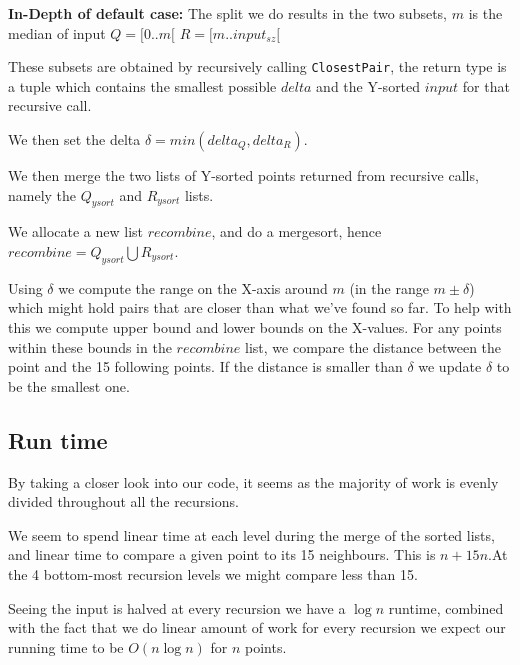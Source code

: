 \documentclass{tufte-handout}
\begin{document}
\bigskip
\textbf{In-Depth of default case:}\newline
The split we do results in the two subsets, $m$ is the median of input\newline
  $Q = \lbrack 0 .. m \lbrack $\newline
  $R = \lbrack m .. input_{sz} \lbrack$ \newline 

These subsets are obtained by recursively calling \verb+ClosestPair+, the return type 
is a tuple which contains the smallest possible $delta$ and the Y-sorted $input$ for that recursive call.

We then set the delta $\delta = min(delta_{Q}, delta_{R})$.\newline

We then merge the two lists of Y-sorted points returned from recursive calls, namely the $Q_{ysort}$ and $R_{ysort}$ lists.

We allocate a new list $recombine$, and do a mergesort, hence\newline $recombine = Q_{y sort} \bigcup R_{y sort}$.
\newline

Using $\delta$ we compute the range on the X-axis around $m$ (in the range $m \pm \delta$) which 
might hold pairs that are closer than what we've found so far.
To help with this we compute upper bound and lower bounds on the X-values.\newline
For any points within these bounds in the $recombine$ list, we compare the distance between the point
 and the 15 following points.
If the distance is smaller than $\delta$ we update $\delta$ to be the smallest one.

\subsection{Run time}
By taking a closer look into our code, it seems as the majority of work is evenly divided throughout all the recursions.

We seem to spend linear time at each level during the merge of the sorted lists, and linear time to 
compare a given point to its 15 neighbours.
This is $n + 15n$.\newline At the 4 bottom-most recursion levels we might compare less than 15.

Seeing the input is halved at every recursion we have a $\log n$ runtime, combined with the fact that we 
do linear amount of work for every recursion we expect our running time to be $O(n\log n)$ for $n$ points.
\end{document}
